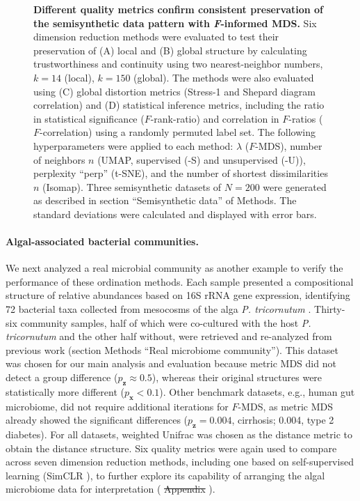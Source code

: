 \documentclass[10pt,letterpaper]{article}
\newcommand{\1}{{\rm 1}\kern-0.24em{\rm I}}
\providecommand{\DIFaddtex}[1]{{\protect\color{blue}\uwave{#1}}} %
\providecommand{\DIFdeltex}[1]{{\protect\color{red}\sout{#1}}}                      %
\providecommand{\DIFaddbegin}{} %
\providecommand{\DIFaddend}{} %
\providecommand{\DIFdelbegin}{} %
\providecommand{\DIFdelend}{} %
\providecommand{\DIFadd}[1]{\texorpdfstring{\DIFaddtex{#1}}{#1}} %
\providecommand{\DIFdel}[1]{\texorpdfstring{\DIFdeltex{#1}}{}} %
\newcommand{\DIFscaledelfig}{0.5}
\newlength{\DIFdelgraphicswidth} %
\newlength{\DIFdelgraphicsheight} %
\newcommand{\DIFaddincludegraphics}[2][]{{\color{blue}\fbox{\DIFOincludegraphics[#1]{#2}}}} %
\newcommand{\DIFdelincludegraphics}[2][]{%
\sbox{\DIFdelgraphicsbox}{\DIFOincludegraphics[#1]{#2}}%
\settoboxwidth{\DIFdelgraphicswidth}{\DIFdelgraphicsbox} %
\settoboxtotalheight{\DIFdelgraphicsheight}{\DIFdelgraphicsbox} %
\scalebox{\DIFscaledelfig}{%
\parbox[b]{\DIFdelgraphicswidth}{\usebox{\DIFdelgraphicsbox}\\[-\baselineskip] \rule{\DIFdelgraphicswidth}{0em}}\llap{\resizebox{\DIFdelgraphicswidth}{\DIFdelgraphicsheight}{%
\setlength{\unitlength}{\DIFdelgraphicswidth}%
\begin{picture}(1,1)%
\thicklines\linethickness{2pt} %
{\color[rgb]{1,0,0}\put(0,0){\framebox(1,1){}}}%
{\color[rgb]{1,0,0}\put(0,0){\line( 1,1){1}}}%
{\color[rgb]{1,0,0}\put(0,1){\line(1,-1){1}}}%
\end{picture}%
}\hspace*{3pt}}} %
} %
\DeclareRobustCommand{\DIFaddbegin}{\DIFOaddbegin \let\includegraphics\DIFaddincludegraphics} %
\DeclareRobustCommand{\DIFaddend}{\DIFOaddend \let\includegraphics\DIFOincludegraphics} %
\DeclareRobustCommand{\DIFdelbegin}{\DIFOdelbegin \let\includegraphics\DIFdelincludegraphics} %
\DeclareRobustCommand{\DIFdelend}{\DIFOaddend \let\includegraphics\DIFOincludegraphics} %
\begin{document}
\begin{figure}[h!]
    \centering
    \caption{\textbf{Different quality metrics confirm consistent preservation of the semisynthetic data pattern with \textit{F}-informed MDS.} Six dimension reduction methods were evaluated to test their preservation of (A) local and (B) global structure by calculating trustworthiness and continuity using two nearest-neighbor numbers, $k=14$ (local), $k=150$ (global). The methods were also evaluated using (C) global distortion metrics (Stress-1 and Shepard diagram correlation) and (D) statistical inference metrics, including the ratio in statistical significance ($F$-rank-ratio) and correlation in $F$-ratios ($F$-correlation) using a randomly permuted label set. The following hyperparameters were applied to each method: $\lambda$ ($F$-MDS), number of neighbors $n$ (UMAP, supervised (-S) and unsupervised (-U)), perplexity ``perp'' (t-SNE), and the number of shortest dissimilarities $n$ (Isomap). Three semisynthetic datasets of $N=200$ were generated as described in section ``Semisynthetic data'' of Methods. The standard deviations were calculated and displayed with error bars.}
    \label{fig:eval_simul}
\end{figure}


\paragraph*{Algal-associated bacterial communities.}
We next analyzed a real microbial community as another example to verify the performance of these ordination methods. Each sample presented a compositional structure of relative abundances based on 16S rRNA gene expression, identifying 72 bacterial taxa collected from mesocosms of the alga \textit{P. tricornutum} \cite{Samo18, Kimbrel19}. Thirty-six community samples, half of which were co-cultured with the host \textit{P. tricornutum} and the other half without, were retrieved and re-analyzed from previous work \cite{kim22} (section Methods ``Real microbiome community''). This dataset was chosen for our main analysis and evaluation because metric MDS did not detect a group difference ($p_\mathbf{z}\approx0.5$), whereas their original structures were statistically more different ($p_\mathbf{x}<0.1$). Other benchmark datasets, e.g., human gut microbiome, did not require additional iterations for $F$-MDS, as metric MDS already showed the significant differences ($p_\mathbf{z}= 0.004$, cirrhosis; 0.004, type 2 diabetes). For all datasets, weighted Unifrac \cite{lozupone07} was chosen as the distance metric to obtain the distance structure. Six quality metrics were again used to compare across seven dimension reduction methods, including one based on self-supervised learning (SimCLR \cite{chen20}), to further explore its capability of arranging the algal microbiome data for interpretation (\DIFdelbegin %
\DIFdel{Appendix }\DIFdelend \DIFaddbegin \DIFadd{Appendix E, } \DIFadd{File}\DIFaddend ). 
\end{document}
